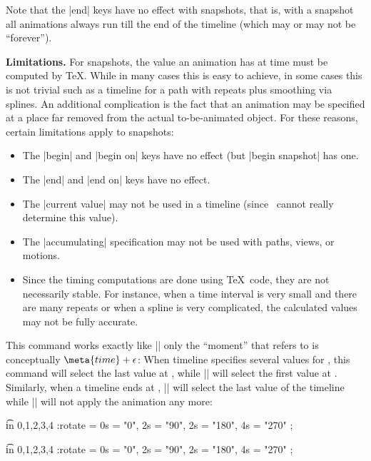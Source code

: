 \begin{command}{\pgfsnapshot{}}
    Note that the |end| keys have no effect with snapshots, that is, with a
    snapshot all animations always run till the end of the timeline (which may
    or may not be ``forever'').


    \medskip\textbf{Limitations.}
    For snapshots, the value an animation has at time  must be
    computed by \TeX. While in many cases this is easy to achieve, in some
    cases this is not trivial such as a timeline for a path with repeats plus
    smoothing via splines. An additional complication is the fact that an
    animation may be specified at a place far removed from the actual
    to-be-animated object. For these reasons, certain limitations apply to
    snapshots:
    \begin{itemize}
        \item The |begin| and |begin on| keys have no effect (but 
            |begin snapshot| has one.
        \item The |end| and |end on| keys have no effect.
        \item The |current value| may not be used in a timeline (since
            \pgfname\ cannot really determine this value).
        \item The |accumulating| specification may not be used with paths,
            views, or motions.
        \item Since the timing computations are done using \TeX\ code, they are
            not necessarily stable. For instance, when a time interval is very
            small and there are many repeats or when a spline is very
            complicated, the calculated values may not be fully accurate.
    \end{itemize}
\end{command}

\begin{command}{\pgfsnapshotafter{}}
    This command works exactly like |\pgfsnapshot| only the ``moment'' that
     refers to is conceptually $\meta{time} + \epsilon$: When
    timeline specifies several values for , this command will select
    the last value at , while |\pgfsnapshot| will select the first
    value at . Similarly, when a timeline ends at ,
    |\pgfsnapshot| will select the last value of the timeline while
    |\pgfsnapshotafter| will not apply the animation any more:
\begin{codeexample}[preamble={\usepgfmodule{animations}}]
\foreach \t in {0,1,2,3,4} {
  \pgfsnapshot{\t}
  \tikz :rotate = { 0s = "0", 2s = "90", 2s = "180", 4s = "270" }
    ; }
\end{codeexample}
\begin{codeexample}[preamble={\usepgfmodule{animations}}]
\foreach \t in {0,1,2,3,4} {
  \pgfsnapshotafter{\t}
  \tikz :rotate = { 0s = "0", 2s = "90", 2s = "180", 4s = "270" }
    ; }
\end{codeexample}
\end{command}


